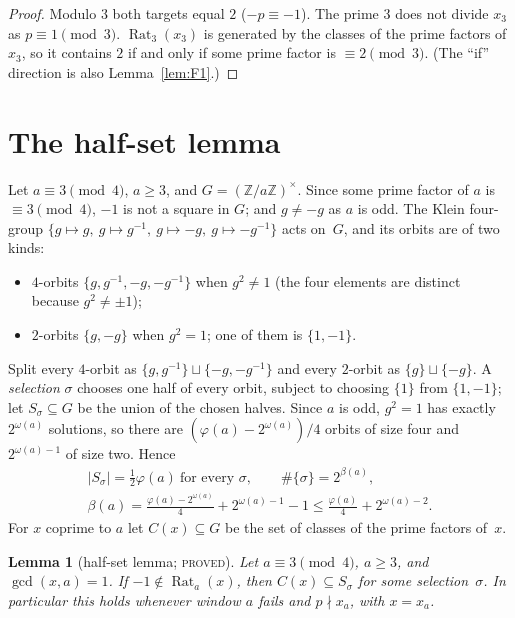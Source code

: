 \documentclass[11pt,reqno]{amsart}
\newtheorem{lemma}[theorem]{Lemma}
\theoremstyle{definition}
\newcommand{\Z}{\mathbb Z}
\newcommand{\Rat}{\operatorname{Rat}}
\newcommand{\status}[1]{\textup{\textsc{#1}}}
\begin{document}
\begin{proof}
Modulo $3$ both targets equal $2$ ($-p\equiv-1$).  The prime $3$ does not
divide $x_3$ as $p\equiv1\pmod3$.  $\Rat_3(x_3)$ is generated by the classes
of the prime factors of $x_3$, so it contains $2$ if and only if some prime
factor is $\equiv2\pmod3$.  (The ``if'' direction is also Lemma~\ref{lem:F1}.)
\end{proof}

\section{The half-set lemma}\label{sec:halfset}

Let $a\equiv3\pmod4$, $a\ge3$, and $G=(\Z/a\Z)^\times$.  Since some prime
factor of $a$ is $\equiv3\pmod4$, $-1$ is not a square in $G$; and $g\ne-g$
as $a$ is odd.  The Klein four-group
$\{g\mapsto g,\ g\mapsto g^{-1},\ g\mapsto-g,\ g\mapsto-g^{-1}\}$ acts on~$G$,
and its orbits are of two kinds:
\begin{itemize}
\item $4$-orbits $\{g,g^{-1},-g,-g^{-1}\}$ when $g^2\ne1$ (the four
 elements are distinct because $g^2\neq\pm1$);
\item $2$-orbits $\{g,-g\}$ when $g^2=1$; one of them is $\{1,-1\}$.
\end{itemize}
Split every $4$-orbit as $\{g,g^{-1}\}\sqcup\{-g,-g^{-1}\}$ and every
$2$-orbit as $\{g\}\sqcup\{-g\}$.  A \emph{selection} $\sigma$ chooses one
half of every orbit, subject to choosing $\{1\}$ from $\{1,-1\}$; let
$S_\sigma\subseteq G$ be the union of the chosen halves.  Since $a$ is odd,
$g^2=1$ has exactly $2^{\omega(a)}$ solutions, so there are
$(\varphi(a)-2^{\omega(a)})/4$ orbits of size four and $2^{\omega(a)-1}$ of
size two.  Hence
\begin{equation}\label{eq:beta}
 \begin{gathered}
 |S_\sigma|=\tfrac12\varphi(a)\ \text{for every }\sigma,\qquad
 \#\{\sigma\}=2^{\beta(a)},\\
 \beta(a)=\frac{\varphi(a)-2^{\omega(a)}}4+2^{\omega(a)-1}-1\le\frac{\varphi(a)}4+2^{\omega(a)-2}.
 \end{gathered}
\end{equation}
For $x$ coprime to $a$ let $C(x)\subseteq G$ be the set of classes of the
prime factors of~$x$.

\begin{lemma}[half-set lemma; \status{proved}]\label{lem:halfset}
Let $a\equiv3\pmod4$, $a\ge3$, and $\gcd(x,a)=1$.  If $-1\notin\Rat_a(x)$,
then $C(x)\subseteq S_\sigma$ for some selection~$\sigma$.  In particular this
holds whenever window $a$ fails and $p\nmid x_a$, with $x=x_a$.
\end{lemma}
\end{document}
